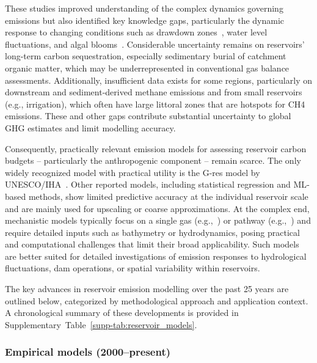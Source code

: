\documentclass[10pt]{article}
\begin{document}
These studies improved understanding of the complex dynamics governing emissions but also identified key knowledge gaps, particularly the dynamic response to changing conditions such as drawdown zones~\cite{Barbosa2024}, water level fluctuations, and algal blooms~\cite{Liao2024-ct}. 
Considerable uncertainty remains on reservoirs' long-term carbon sequestration, especially sedimentary burial of catchment organic matter, which may be underrepresented in conventional gas balance assessments. 
Additionally, insufficient data exists for some regions, particularly on downstream and sediment-derived methane emissions and from small reservoirs (e.g., irrigation), which often have large littoral zones that are hotspots for \ac{CH4} emissions. 
These and other gaps contribute substantial uncertainty to global \ac{GHG} estimates and limit modelling accuracy.

Consequently, practically relevant emission models for assessing reservoir carbon budgets -- particularly the anthropogenic component -- remain scarce. 
The only widely recognized model with practical utility is the G-res model by UNESCO/IHA~\cite{Prairie2017b, Prairie2021}. 
Other reported models, including statistical regression and \ac{ML}-based methods, show limited predictive accuracy at the individual reservoir scale~\cite{Hansen2022} and are mainly used for upscaling or coarse approximations. 
At the complex end, mechanistic models typically focus on a single gas (e.g.,~\cite{Wu2022, Lomov2024}) or pathway (e.g.,~\cite{Berger2014}) and require detailed inputs such as bathymetry or hydrodynamics, posing practical and computational challenges that limit their broad applicability. 
Such models are better suited for detailed investigations of emission responses to hydrological fluctuations, dam operations, or spatial variability within reservoirs.

The key advances in reservoir emission modelling over the past 25 years are outlined below, categorized by methodological approach and application context. A chronological summary of these developments is provided in Supplementary~Table~\ref{supp-tab:reservoir_models}.

\subsubsection{Empirical models (2000--present)}
\label{subsec:empirical_models}
\end{document}
